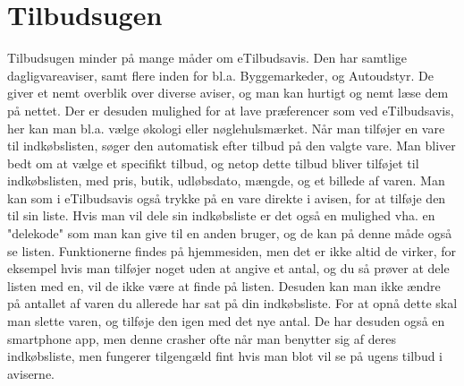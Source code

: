 \section{Tilbudsugen}

Tilbudsugen minder på mange måder om eTilbudsavis. 
Den har samtlige dagligvareaviser, samt flere inden for bl.a. Byggemarkeder, og Autoudstyr.
De giver et nemt overblik over diverse aviser, og man kan hurtigt og nemt læse dem på nettet. 
Der er desuden mulighed for at lave præferencer som ved eTilbudsavis, her kan man bl.a. vælge økologi eller nøglehulsmærket.
Når man tilføjer en vare til indkøbslisten, søger den automatisk efter tilbud på den valgte vare. 
Man bliver bedt om at vælge et specifikt tilbud, og netop dette tilbud bliver tilføjet til indkøbslisten, med pris, butik, udløbsdato, mængde, og et billede af varen.
Man kan som i eTilbudsavis også trykke på en vare direkte i avisen, for at tilføje den til sin liste.
Hvis man vil dele sin indkøbsliste er det også en mulighed vha. en "delekode" som man kan give til en anden bruger, og de kan på denne måde også se listen.
Funktionerne findes på hjemmesiden, men det er ikke altid de virker, for eksempel hvis man tilføjer noget uden at angive et antal, og du så prøver at dele listen med en, vil de ikke være at finde på listen.
Desuden kan man ikke ændre på antallet af varen du allerede har sat på din indkøbsliste. 
For at opnå dette skal man slette varen, og tilføje den igen med det nye antal.
De har desuden også en smartphone app, men denne crasher ofte når man benytter sig af deres indkøbsliste, men fungerer tilgengæld fint hvis man blot vil se på ugens tilbud i aviserne.

